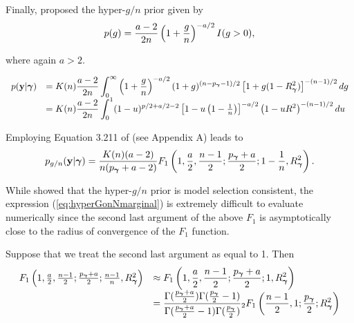 \documentclass{article}[12pt]
\begin{document}
Finally, \cite{Liang2008} proposed the hyper-$g/n$ prior given by
\begin{equation}\label{eq:hyperGonN}
\displaystyle p(g) = \frac{a - 2}{2n}\left( 1 + \frac{g}{n} \right)^{-a/2}I(g>0),
\end{equation}

\noindent where again $a>2$. 


$$
\begin{array}{rl}
p(\vy|\vgamma) 
& \ds 
= K(n) \frac{a - 2}{2n}  \int_0^\infty 
\left( 1 + \frac{g}{n} \right)^{-a/2}
(1 + g)^{(n-p_\vgamma-1)/2} \left[ 1 + g (1 - R_\vgamma^2) \right]^{-(n-1)/2}  dg
\\
& \ds = K(n) \frac{a - 2}{2n}  \int_0^1 
(1 - u)^{p/2 + a/2 - 2  } \left[ 1 - u \left(1  -  \tfrac{1}{n} \right) \right]^{-a/2} \left(  1 - u R^2\right)^{-(n-1)/2} du

\end{array} 
$$

\noindent Employing 
Equation 3.211 of \cite{Gradshteyn2007} (see Appendix A) leads to
\begin{equation}\label{eq:hyperGonNmarginal}
\displaystyle p_{g/n}({\bf y}|{\boldsymbol \gamma}) =  \frac{K(n)(a - 2)}{n(p_{\boldsymbol \gamma} + a - 2)} F_1\left( 1, \frac{a}{2}, \frac{n-1}{2}; \frac{p_{\boldsymbol \gamma} + a}{2}; 1  -  \frac{1}{n}, R_{\boldsymbol \gamma}^2 \right).
\end{equation}

 
\noindent While \cite{Liang2008} showed that the hyper-$g/n$ prior is model
selection consistent, the expression (\ref{eq:hyperGonNmarginal}) is extremely
difficult to evaluate numerically since the second last argument of the above 
$F_1$ is asymptotically close to the radius of convergence of the $F_1$
function.

Suppose that we treat the second last argument as equal to 1. Then
$$
\begin{array}{rl}
F_1\left( 1, \frac{a}{2}, \frac{n-1}{2}; \frac{p_{\boldsymbol \gamma} + a}{2}; \frac{n - 1}{n}, R_{\boldsymbol \gamma}^2 \right) 
& \displaystyle \approx F_1\left( 1, \frac{a}{2}, \frac{n-1}{2}; \frac{p_{\boldsymbol \gamma} + a}{2}; 1, R_{\boldsymbol \gamma}^2 \right)
\\
& \displaystyle = \frac{\Gamma(\frac{p_{\boldsymbol \gamma} + a}{2})\Gamma(\frac{p_{\boldsymbol \gamma}}{2} - 1)}{\Gamma(\frac{p_{\boldsymbol \gamma} + a}{2} - 1)\Gamma(\frac{p_{\boldsymbol \gamma}}{2})} {}_2F_1\left( \frac{n-1}{2}, 1; \frac{p_{\boldsymbol \gamma}}{2};  R_{\boldsymbol \gamma}^2 \right)
\end{array} 
$$
\end{document}
